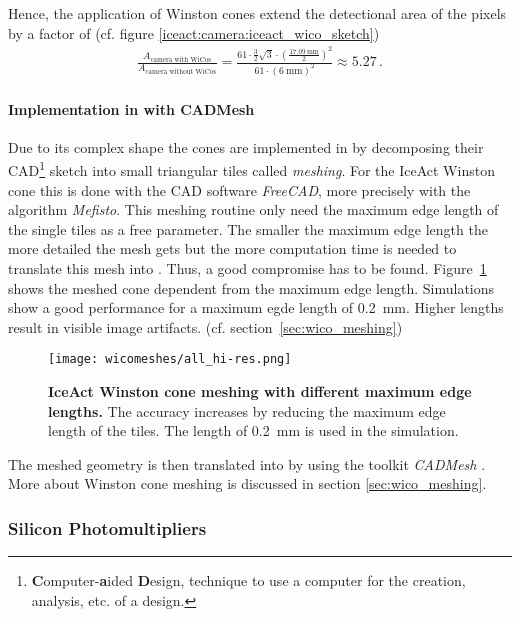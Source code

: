 Hence, the application of Winston cones extend the detectional area of the pixels by a factor of (cf. figure \ref{iceact:camera:iceact_wico_sketch})
\begin{align}
	\frac{A_\text{camera with WiCos}}{A_\text{camera without WiCos}} = \frac{61\cdot \frac{3}{2}\sqrt{3}\cdot\left(\frac{\SI{17.09}{\milli\meter}}{2}\right)^2}{61\cdot(\SI{6}{\milli\meter})^2}\approx\num{5.27}\,.
\end{align}

\paragraph{Implementation in \geant with CADMesh}

Due to its complex shape the cones are implemented in \geant by decomposing their CAD\footnote{\textbf{C}omputer-\textbf{a}ided \textbf{D}esign, technique to use a computer for the creation, analysis, etc. of a design.} sketch into small triangular tiles called \textit{meshing}. For the IceAct Winston cone this is done with the CAD software \textit{FreeCAD}, more precisely with the algorithm \textit{Mefisto}. This meshing routine only need the maximum edge length of the single tiles as a free parameter. The smaller the maximum edge length the more detailed the mesh gets but the more computation time is needed to translate this mesh into \geant. Thus, a good compromise has to be found. Figure~\ref{wico:meshing} shows the meshed cone dependent from the maximum edge length. Simulations show a good performance for a maximum egde length of \SI{0.2}{\milli\meter}. Higher lengths result in visible image artifacts. (cf. section~\ref{sec:wico_meshing}) 

\begin{figure}[H]
	\centering
	\texttt{[image: wicomeshes/all\_hi-res.png]}
	\caption[IceAct Winston cone meshing with different maximum edge lengths]{\textbf{IceAct Winston cone meshing with different maximum edge lengths.} The accuracy increases by reducing the maximum edge length of the tiles. The length of \SI{0.2}{\milli\meter} is used in the simulation.}
	\label{wico:meshing}	
\end{figure}

The meshed geometry is then translated into \geant by using the toolkit \textit{CADMesh} \cite{wico:cadmesh}. More about Winston cone meshing is discussed in section \ref{sec:wico_meshing}.

\subsubsection{Silicon Photomultipliers}\label{sec:sipm}


